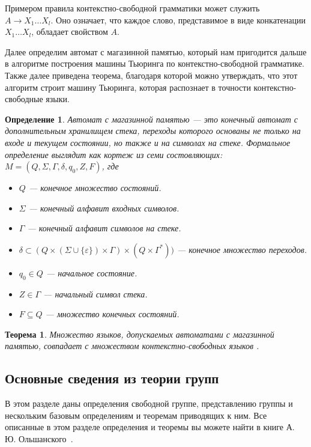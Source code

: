 \documentclass[14pt]{matmex-diploma-custom}
\newtheorem{thm}{Теорема}[subsection]
\newtheorem{defn}{Определение}[subsection]
\begin{document}
Примером правила контекстно-свободной грамматики может служить $A \to X_1 \dots X_l$.
Оно означает, что каждое слово, представимое в виде конкатенации $X_1 \dots X_l$, 
обладает свойством $A$.

Далее определим автомат с магазинной памятью, который нам пригодится дальше в алгоритме
построения машины Тьюринга по контекстно-свободной грамматике. Также далее приведена теорема, благодаря которой можно
утверждать, что этот алгоритм строит машину Тьюринга, которая распознает в точности контекстно-свободные
языки.

\begin{defn}
Автомат с магазинной памятью --- это конечный автомат с дополнительным хранилищем стека, 
переходы которого основаны не только на входе и текущем состоянии, но также и на символах на стеке. 
Формальное определение выглядит как кортеж из семи состовляющих:
$M=(Q,\Sigma ,\Gamma ,\delta ,q_{0},Z,F)$, где
\begin{itemize}
    \item $Q$ --- конечное множество состояний.
    \item $\Sigma$ --- конечный алфавит входных символов. 
    \item $\Gamma$ --- конечный алфавит символов на стеке.
    \item $\delta \subset (Q \times (\Sigma \cup \{\varepsilon \})\times \Gamma) \times (Q\times \Gamma^{*}))$ --- конечное множество переходов.
    \item $q_{0}\in Q$ --- начальное состояние.
    \item $Z\in \Gamma$ --- начальный символ стека.
    \item $F\subseteq Q$ --- множество конечных состояний.
\end{itemize}
\end{defn}

\begin{thm} \label{thmpda}
Множество языков, допускаемых автоматами с магазинной памятью, совпадает с множеством контекстно-свободных языков \cite{hopcroft2013introduction}.
\end{thm}

\subsection{Основные сведения из теории групп}

В этом разделе даны определения свободной группе, представлению группы и нескольким базовым определениям и теоремам приводящих к ним. Все описанные в этом
разделе определения и теоремы вы можете найти в книге А. Ю. Ольшанского~\cite{geomTheoryGroup}.
\end{document}
